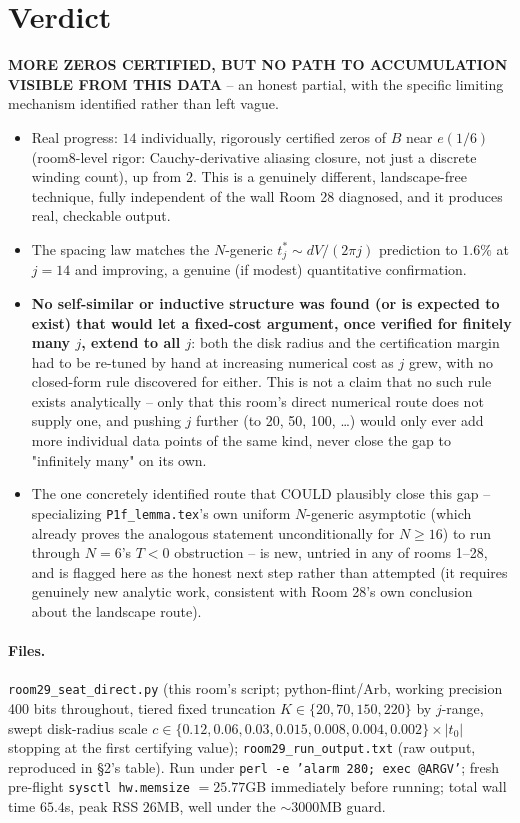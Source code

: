 \documentclass[11pt]{article}
\begin{document}
\section*{Verdict}
\textbf{MORE ZEROS CERTIFIED, BUT NO PATH TO ACCUMULATION VISIBLE FROM THIS DATA} -- an honest
partial, with the specific limiting mechanism identified rather than left vague.
\begin{itemize}
\item Real progress: $14$ individually, rigorously certified zeros of $B$ near $e(1/6)$
(room8-level rigor: Cauchy-derivative aliasing closure, not just a discrete winding count), up from
$2$. This is a genuinely different, landscape-free technique, fully independent of the wall Room 28
diagnosed, and it produces real, checkable output.
\item The spacing law matches the $N$-generic $t^*_j\sim dV/(2\pi j)$ prediction to $1.6\%$ at
$j=14$ and improving, a genuine (if modest) quantitative confirmation.
\item \textbf{No self-similar or inductive structure was found (or is expected to exist) that would
let a fixed-cost argument, once verified for finitely many $j$, extend to all $j$}: both the disk
radius and the certification margin had to be re-tuned by hand at increasing numerical cost as $j$
grew, with no closed-form rule discovered for either. This is not a claim that no such rule exists
analytically -- only that this room's direct numerical route does not supply one, and pushing $j$
further (to 20, 50, 100, \ldots) would only ever add more individual data points of the same kind,
never close the gap to "infinitely many" on its own.
\item The one concretely identified route that COULD plausibly close this gap -- specializing
\texttt{P1f\_lemma.tex}'s own uniform $N$-generic asymptotic (which already proves the analogous
statement unconditionally for $N\ge16$) to run through $N=6$'s $T<0$ obstruction -- is new,
untried in any of rooms 1--28, and is flagged here as the honest next step rather than attempted
(it requires genuinely new analytic work, consistent with Room 28's own conclusion about the
landscape route).
\end{itemize}

\paragraph{Files.} \texttt{room29\_seat\_direct.py} (this room's script; python-flint/Arb, working
precision 400 bits throughout, tiered fixed truncation $K\in\{20,70,150,220\}$ by $j$-range, swept
disk-radius scale $c\in\{0.12,0.06,0.03,0.015,0.008,0.004,0.002\}\times|t_0|$ stopping at the first
certifying value); \texttt{room29\_run\_output.txt} (raw output, reproduced in \S2's table).
Run under \texttt{perl -e 'alarm 280; exec @ARGV'}; fresh pre-flight \texttt{sysctl hw.memsize}
$=25.77$GB immediately before running; total wall time $65.4$s, peak RSS $26$MB, well under the
$\sim3000$MB guard.
\end{document}
